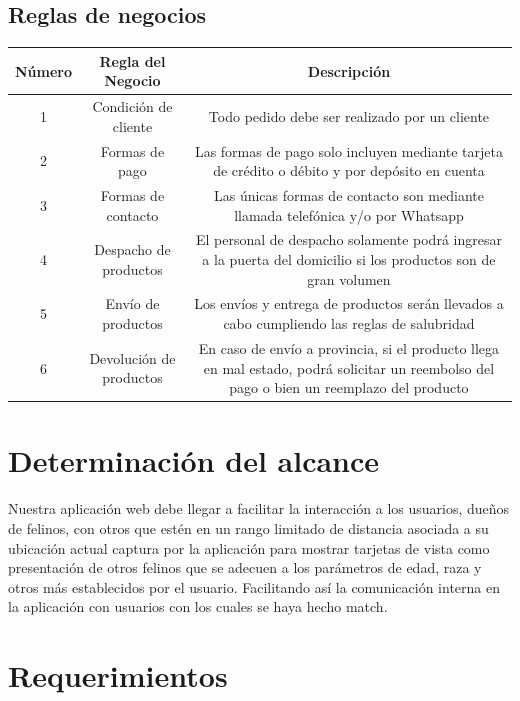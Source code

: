 \documentclass{article}
\begin{document}
\subsection{Reglas de negocios}
\begin{tabular}{| c | c | c |}
    \hline
    Número & Regla del Negocio & Descripción \\ \hline
    1 & Condición de cliente & Todo pedido debe ser realizado por un cliente \\
    2 & Formas de pago & Las formas de pago solo incluyen mediante tarjeta de crédito o débito y por depósito en cuenta \\
    3 & Formas de contacto & Las únicas formas de contacto son mediante llamada telefónica y/o por Whatsapp \\
    4 & Despacho de productos & El personal de despacho solamente podrá ingresar a la puerta del domicilio si los productos son de gran volumen \\
    5 & Envío de productos & Los envíos y entrega de productos serán llevados a cabo cumpliendo las reglas de salubridad \\
    6 & Devolución de productos & En caso de envío a provincia, si el producto llega en mal estado, podrá solicitar un reembolso del pago o bien un reemplazo del producto \\ \hline
    \end{tabular}
\clearpage
\section{Determinación del alcance}
Nuestra aplicación web debe llegar a facilitar la interacción a los usuarios, dueños de felinos, con otros que estén en un rango limitado de distancia asociada a su ubicación actual captura por la aplicación para mostrar tarjetas de vista como presentación de otros felinos que se adecuen a los parámetros de edad, raza y otros más establecidos por el usuario. Facilitando así la comunicación interna en la aplicación con usuarios con los cuales se haya hecho match.
\section{Requerimientos}
\end{document}
